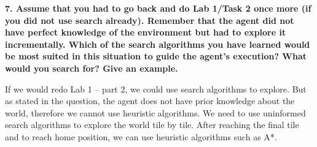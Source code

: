 \documentclass[a4paper,10pt]{article}
\begin{document}
\textbf{7. Assume that you had to go back and do Lab 1/Task 2 once more 
(if you did not use search already). 
Remember that the agent did not have perfect knowledge of the environment but had to explore 
it incrementally. Which of the search algorithms you have learned would be most suited in 
this situation to guide the agent's execution? What would you search for? Give an example.}

If we would redo Lab 1 – part 2, we could use search algorithms to explore. 
But as stated in the question, the agent does not have prior knowledge about the world, 
therefore we cannot use heuristic algorithms. We need to use 
uninformed search algorithms to explore the world tile by tile. 
After reaching the final tile and to reach home position, we can use heuristic algorithms such as A*.
\end{document}
